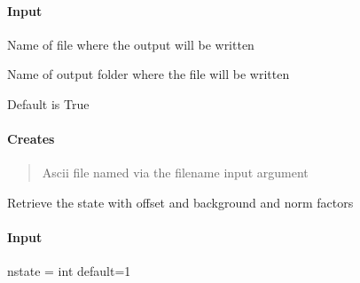 \documentclass[letterpaper,10pt,english]{sphinxmanual}
\begin{document}
\begin{fulllineitems}
\begin{fulllineitems}
\paragraph{Input}
\label{\detokenize{api/pymusepipe:id20}}\begin{description}
\sphinxAtStartPar
Name of file where the output will be written

\sphinxAtStartPar
Name of output folder where the file will be written

\sphinxAtStartPar
Default is True

\end{description}


\paragraph{Creates}
\label{\detokenize{api/pymusepipe:id21}}\begin{quote}

\sphinxAtStartPar
Ascii file named via the filename input argument
\end{quote}

\end{fulllineitems}


\begin{fulllineitems}
\label{\detokenize{api/pymusepipe:pymusepipe.align_pipe.AlignMuseDataset.retrieve_state}}
\pysigstartsignatures
{}
\pysigstopsignatures
\sphinxAtStartPar
Retrieve the state with offset and background and norm factors


\paragraph{Input}
\label{\detokenize{api/pymusepipe:id22}}
\sphinxAtStartPar
nstate = int default=1

\end{fulllineitems}



\end{fulllineitems}
\end{document}

